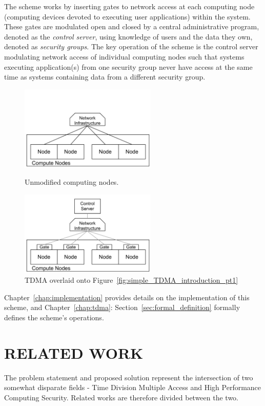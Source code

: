 \documentclass[oneside,12pt]{memoir}
\begin{document}
The scheme works by inserting gates to network access at each computing node (computing devices devoted to executing user applications) within the system. These gates are modulated open and closed by a central administrative program, denoted as the \textit{control server}, using knowledge of users and the data they own, denoted as \textit{security groups}. The key operation of the scheme is the control server modulating network access of individual computing nodes such that systems executing application(s) from one security group never have access at the same time as systems containing data from a different security group.

\begin{figure}
\centering
\begin{minipage}{6.5cm}
\includegraphics[width=6.5cm]{Simple_TDMA_Introduction_pt1.pdf}
\caption{Unmodified computing nodes.}
\label{fig:simple_TDMA_introduction_pt1}
\end{minipage}
\hspace{1em}
\begin{minipage}{6.5cm}
\includegraphics[width=6.5cm]{Simple_TDMA_Introduction_pt2.pdf}
\caption{TDMA overlaid onto Figure~\ref{fig:simple_TDMA_introduction_pt1}}
\label{fig:simple_TDMA_introduction_pt2}
\end{minipage}
\end{figure}

Chapter~\ref{chap:implementation} provides details on the implementation of this scheme, and Chapter~\ref{chap:tdma}: Section~\ref{sec:formal_definition} formally defines the scheme's operations.
\chapter{RELATED WORK}
The problem statement and proposed solution represent the intersection of two somewhat disparate fields - Time Division Multiple Access and High Performance Computing Security. Related works are therefore divided between the two. 
\end{document}
